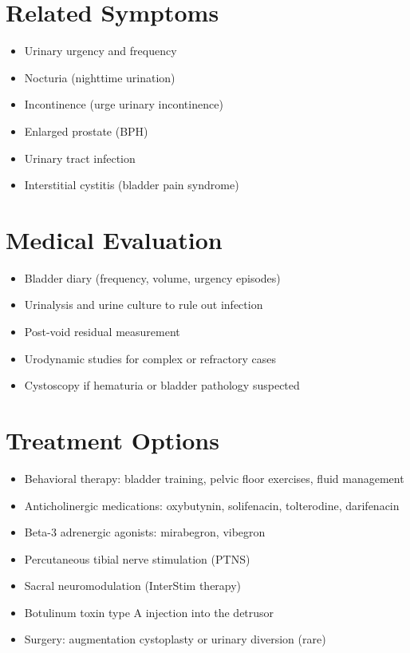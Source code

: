 \section*{Related Symptoms}
\begin{itemize}
\item Urinary urgency and frequency
\item Nocturia (nighttime urination)
\item Incontinence (urge urinary incontinence)
\item Enlarged prostate (BPH)
\item Urinary tract infection
\item Interstitial cystitis (bladder pain syndrome)
\end{itemize}

\section*{Medical Evaluation}
\begin{itemize}
\item Bladder diary (frequency, volume, urgency episodes)
\item Urinalysis and urine culture to rule out infection
\item Post-void residual measurement
\item Urodynamic studies for complex or refractory cases
\item Cystoscopy if hematuria or bladder pathology suspected
\end{itemize}

\section*{Treatment Options}
\begin{itemize}
\item Behavioral therapy: bladder training, pelvic floor exercises, fluid management
\item Anticholinergic medications: oxybutynin, solifenacin, tolterodine, darifenacin
\item Beta-3 adrenergic agonists: mirabegron, vibegron
\item Percutaneous tibial nerve stimulation (PTNS)
\item Sacral neuromodulation (InterStim therapy)
\item Botulinum toxin type A injection into the detrusor
\item Surgery: augmentation cystoplasty or urinary diversion (rare)
\end{itemize}

